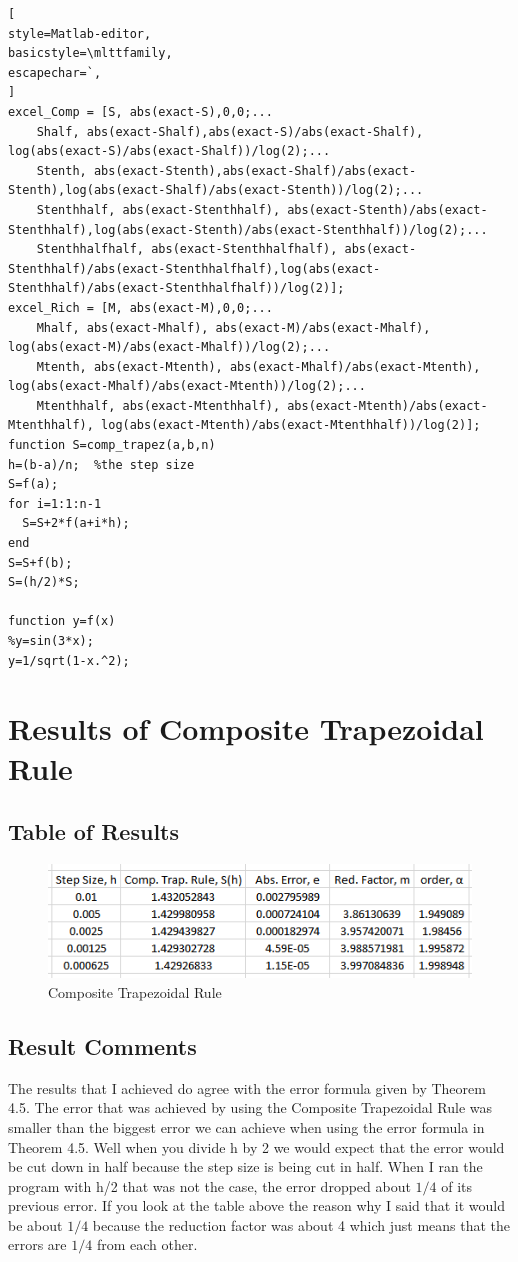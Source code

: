 \documentclass[12pt]{article}
\begin{document}
\begin{lstlisting}[
style=Matlab-editor,
basicstyle=\mlttfamily,
escapechar=`,
]
excel_Comp = [S, abs(exact-S),0,0;...
    Shalf, abs(exact-Shalf),abs(exact-S)/abs(exact-Shalf), log(abs(exact-S)/abs(exact-Shalf))/log(2);...
    Stenth, abs(exact-Stenth),abs(exact-Shalf)/abs(exact-Stenth),log(abs(exact-Shalf)/abs(exact-Stenth))/log(2);...
    Stenthhalf, abs(exact-Stenthhalf), abs(exact-Stenth)/abs(exact-Stenthhalf),log(abs(exact-Stenth)/abs(exact-Stenthhalf))/log(2);...
    Stenthhalfhalf, abs(exact-Stenthhalfhalf), abs(exact-Stenthhalf)/abs(exact-Stenthhalfhalf),log(abs(exact-Stenthhalf)/abs(exact-Stenthhalfhalf))/log(2)];
excel_Rich = [M, abs(exact-M),0,0;...
    Mhalf, abs(exact-Mhalf), abs(exact-M)/abs(exact-Mhalf), log(abs(exact-M)/abs(exact-Mhalf))/log(2);...
    Mtenth, abs(exact-Mtenth), abs(exact-Mhalf)/abs(exact-Mtenth), log(abs(exact-Mhalf)/abs(exact-Mtenth))/log(2);...
    Mtenthhalf, abs(exact-Mtenthhalf), abs(exact-Mtenth)/abs(exact-Mtenthhalf), log(abs(exact-Mtenth)/abs(exact-Mtenthhalf))/log(2)];
function S=comp_trapez(a,b,n)
h=(b-a)/n;  %the step size
S=f(a);
for i=1:1:n-1
  S=S+2*f(a+i*h);
end
S=S+f(b);
S=(h/2)*S;

function y=f(x)
%y=sin(3*x);
y=1/sqrt(1-x.^2);
\end{lstlisting}
\section{Results of Composite Trapezoidal Rule}
\subsection{Table of Results}
\begin{figure}[H]
  \centering
  \includegraphics[width=13cm]{Comp_Trap_Rule.png}
     \caption{Composite Trapezoidal Rule}
         \label{FigVibStab}
\end{figure}
\subsection{Result Comments}
The results that I achieved do agree with the error formula given by Theorem 4.5. The error that was achieved by using the Composite Trapezoidal Rule was smaller than the biggest error we can achieve when using the error formula in Theorem 4.5.
Well when you divide h by 2 we would expect that the error would be cut down in half because the step size is being cut in half. When I ran the program with h/2 that was not the case, the error dropped about $1/4$ of its previous error. If you look at the table above the reason why I said that it would be about $1/4$ because the reduction factor was about 4 which just means that the errors are $1/4$ from each other.
\end{document}
